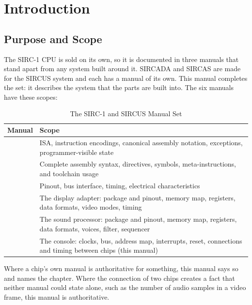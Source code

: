 \chapter{Introduction}
\label{ch:introduction}

\section{Purpose and Scope}

The SIRC-1 CPU is sold on its own, so it is documented in three manuals that stand apart from any system built around
it. SIRCADA and SIRCAS are made for the SIRCUS system and each has a manual of its own. This manual completes the set:
it describes the system that the parts are built into. The six manuals have these scopes:

\begin{table}[H]
	\centering
	\begin{tabular}{lp{8.2cm}}
		\toprule
		\textbf{Manual} & \textbf{Scope}                                                                                               \\
		\midrule
		\archmanual{}   & ISA, instruction encodings, canonical assembly notation, exceptions, programmer-visible state                \\
		\asmmanual{}    & Complete assembly syntax, directives, symbols, meta-instructions, and toolchain usage                        \\
		\hwmanual{}     & Pinout, bus interface, timing, electrical characteristics                                                    \\
		\videomanual{}  & The display adapter: package and pinout, memory map, registers, data formats, video modes, timing            \\
		\audiomanual{}  & The sound processor: package and pinout, memory map, registers, data formats, voices, filter, sequencer      \\
		\sysmanual{}    & The console: clocks, bus, address map, interrupts, reset, connections and timing between chips (this manual) \\
		\bottomrule
	\end{tabular}
	\caption{The SIRC-1 and SIRCUS Manual Set}
	\label{tab:manual-set}
\end{table}

Where a chip's own manual is authoritative for something, this manual says so and names the chapter. Where the
connection of two chips creates a fact that neither manual could state alone, such as the number of audio samples in a
video frame, this manual is authoritative.

